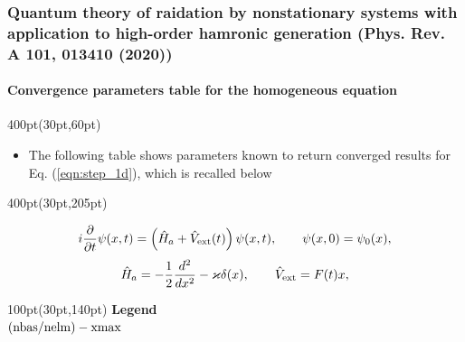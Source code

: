 \begin{frame}
\frametitle{Quantum theory of raidation by nonstationary systems 
	with application to high-order hamronic generation
        (Phys. Rev. A 101, 013410 (2020))}
	\framesubtitle{Convergence parameters table for 
             the homogeneous equation}
\small

\begin{textblock*}{400pt}(30pt,60pt)
\footnotesize
\begin{itemize}
\item The following table shows parameters known to return converged results 
for Eq. (\ref{eqn:step_1d}), which is recalled below
\end{itemize}

\end{textblock*}

\vspace{20pt}

{
\tiny 


}


\begin{textblock*}{400pt}(30pt,205pt)
\scriptsize

\begin{equation}
	i\frac{\partial}{\partial t}\psi(x,t)
	   = \left( \hat{H}_a + \hat{V}_{\rm ext}(t)\right) 
	   \psi(x,t),   \hspace{20pt}\psi(x,0)=\psi_0(x), \nonumber
\end{equation}
\begin{equation}
  \hat{H}_a = -\frac{1}{2}\frac{d^2}{dx^2} - \varkappa\delta(x), \hspace{20pt}
  \hat{V}_{\rm ext} = F(t)x,   \nonumber
\end{equation}

\end{textblock*}


\begin{textblock*}{100pt}(30pt,140pt)
\scriptsize
\textbf{Legend} \\
$\rm (nbas/nelm) - xmax $


\end{textblock*}

\end{frame}



